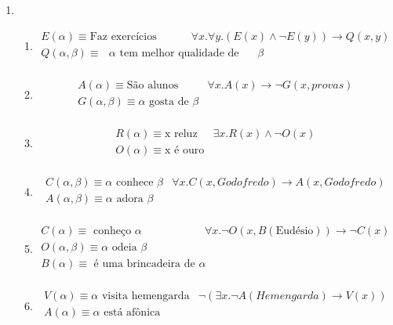\begin{enumerate}
		\item
		\begin{enumerate}
			\item 
			\[
			 \begin{array}{l|l}    
			 	E(\alpha) \equiv \text{Faz exerc\'icios} & \forall x. \forall y.(E(x) \land \neg E(y)) \to Q(x, y) \\
			 	Q(\alpha, \beta) \equiv \text{ $\alpha$ tem melhor qualidade de vida do que $\beta$} & \\
			 \end{array}
			\]
			\item
			\[
			 \begin{array}{l|l}    
			 	A(\alpha) \equiv \text{S\~ao alunos} & \forall x. A(x) \to \neg G(x, provas) \\
			 	G(\alpha, \beta) \equiv \alpha \text{ gosta de } \beta & \\
			 \end{array}
			\] 
			\item
			\[
			 \begin{array}{l|l}    
			 	R(\alpha) \equiv \text{x reluz} & \exists x. R(x) \land \neg O(x) \\
			 	O(\alpha) \equiv \text{x \'e ouro} & \\
			 \end{array}
			\] 
			\item
			\[
		 	\begin{array}{l|l}    
			 	C(\alpha, \beta) \equiv \alpha \text{ conhece } \beta & \forall x. C(x, Godofredo) \to A (x, Godofredo) \\
			 	A(\alpha, \beta) \equiv \alpha \text{ adora } \beta & \\
		 	\end{array}
			\] 
			\item
			\[
			 \begin{array}{l|l}    
			 	C(\alpha) \equiv \text{ conhe\c{c}o } \alpha & \forall x. \neg O(x, B(\text{Eud\'esio})) \to \neg C(x) \\
			 	O(\alpha, \beta) \equiv \alpha \text{ odeia } \beta & \\
			 	B(\alpha) \equiv \text{ \'e uma brincadeira de } \alpha & \\
			 \end{array}
		    \]
			\item 
			\[
			 \begin{array}{l|l}    
			 	V(\alpha) \equiv \alpha \text{ visita hemengarda}& \neg(\exists x. \neg A(Hemengarda) \to V(x))  \\
			 	A(\alpha) \equiv \alpha \text{ est\'a af\^onica} & \\
			 \end{array}
	 		\]
		\end{enumerate}	
		

\end{enumerate}

